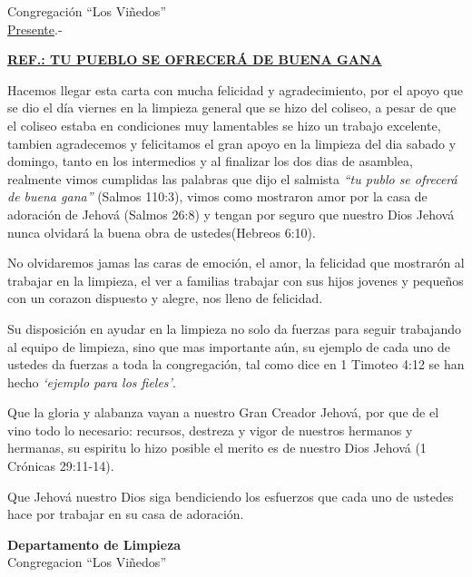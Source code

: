 \documentclass[letterpaper,12pt]{letter}
\begin{document}
\date{26 de mayo de 2011}

\begin{letter}{Congregaci\'on ``Los Vi\~nedos'' \\ \underline{Presente}.-}
\begin{center}
\opening{\underline{{\bfseries REF.: TU PUEBLO SE OFRECER\'A DE BUENA GANA}}} 
\end{center}

Hacemos llegar esta carta con mucha felicidad y agradecimiento, por el apoyo que se dio el d\'ia viernes en la limpieza general 
que se hizo del coliseo, a pesar de que el coliseo estaba en condiciones muy lamentables se hizo un trabajo excelente, tambien 
agradecemos y felicitamos el gran apoyo en la limpieza del dia sabado y domingo, tanto en los intermedios y al finalizar los 
dos dias de asamblea, realmente vimos cumplidas las palabras que dijo el salmista {\it ``tu publo se ofrecerá de buena gana''} 
(Salmos 110:3), vimos como mostraron amor por la casa de adoraci\'on de Jehová (Salmos 26:8) y tengan por seguro que nuestro Dios 
Jehová nunca olvidará la buena obra de ustedes(Hebreos 6:10).

No olvidaremos jamas las caras de emoción, el amor, la felicidad que mostrarón al trabajar en la limpieza, el ver a familias 
trabajar con sus hijos jovenes y pequeños con un corazon dispuesto y alegre, nos lleno de felicidad.

Su disposición en ayudar en la limpieza no solo da fuerzas para seguir trabajando al equipo de limpieza, sino que mas importante 
a\'un, su ejemplo de cada uno de ustedes da fuerzas a toda la congregación, tal como dice en 1 Timoteo 4:12 se han hecho {\it `ejemplo 
para los fieles'}.

Que la gloria y alabanza vayan a nuestro Gran Creador Jehová, por que de el vino todo lo necesario: recursos, destreza y vigor de 
nuestros hermanos y hermanas, su espiritu lo hizo posible el merito es de nuestro Dios Jehová (1 Crónicas 29:11-14).

Que Jehová nuestro Dios siga bendiciendo los esfuerzos que cada uno de ustedes hace por trabajar en su casa de adoración.

\vspace{0.5cm}


\signature{\\$$TITLE$$}
{\bfseries Departamento de Limpieza}\\
Congregacion ``Los Vi\~nedos''





\end{letter}
\end{document}

